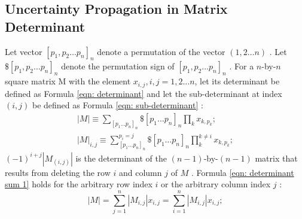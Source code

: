 \documentclass[twoside]{article}
\numberwithin{equation}{section}
\begin{document}
\subsection{Uncertainty Propagation in Matrix Determinant}

Let vector $[p_{1}, p_{2} \dots p_{n}]_{n}$ denote a permutation of the vector $(1,2\dots n)$ \cite{Linear_Algebra}.  Let $\$[p_{1}, p_{2} \dots p_{n}]_{n}$ denote the permutation sign of $[p_{1}, p_{2} \dots p_{n}]_{n}$ \cite{Linear_Algebra}.  For a $n$-by-$n$ square matrix M with the element $x_{i,j}, i,j=1,2\dots n$, let its determinant be defined as Formula \eqref{eqn: determinant} \cite{Numerical_Recipes} and let the sub-determinant at index $(i, j)$ be defined as Formula \eqref{eqn: sub-determinant} \cite{Linear_Algebra}:
\begin{align}
\label{eqn: determinant}
|M| \equiv 
\sum_{[p_{1}\dots p_{n}]_{n}} \$ [p_{1}\dots p_{n}]_{n} 
    \prod _{k} x_{k,p_{k}}; \\
\label{eqn: sub-determinant}
|M|_{i,j} \equiv 
\sum_{[p_{1}\dots p_{n}]_{n}}^{p_{i} = j} \$ [p_{1}\dots p_{n}]_{n} 
    \prod _{k}^{k \ne i} x_{k,p_{k}};
\end{align}
$(-1)^{i+j} |M_{(i,j)}|$ is the determinant of the $(n-1)$-by-$(n-1)$ matrix that results from deleting the row $i$ and column $j$ of $M$ \cite{Numerical_Recipes}.  Formula \eqref{eqn: determinant sum 1} holds for the arbitrary row index $i$ or the arbitrary column index $j$ \cite{Numerical_Recipes}:
\begin{equation}
\label{eqn: determinant sum 1}
|M| =\sum_{j=1}^{n} |M_{i,j}| x_{i,j} = \sum_{i=1}^{n} |M_{i,j}| x_{i,j};
\end{equation}
\end{document}

